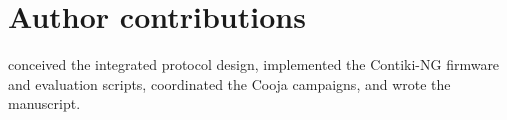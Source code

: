 \section*{Author contributions}
\textbf{\PaperAuthorNameShort{}} conceived the integrated protocol design, implemented the Contiki-NG firmware and evaluation scripts, coordinated the Cooja campaigns, and wrote the manuscript.

